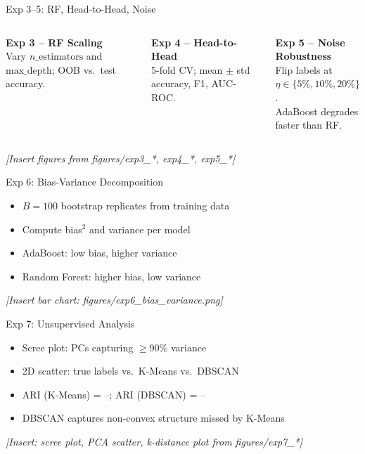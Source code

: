\documentclass[aspectratio=169,12pt]{beamer}
\begin{document}
\begin{frame}{Exp 3--5: RF, Head-to-Head, Noise}
\begin{columns}
\textbf{Exp 3 -- RF Scaling}\\
Vary $n\_\text{estimators}$ and $\text{max\_depth}$; OOB vs.\ test accuracy.

\medskip
\textbf{Exp 4 -- Head-to-Head}\\
5-fold CV; mean $\pm$ std accuracy, F1, AUC-ROC.

\textbf{Exp 5 -- Noise Robustness}\\
Flip labels at $\eta \in \{5\%, 10\%, 20\%\}$.\\
AdaBoost degrades faster than RF.
\end{columns}
\vfill
\textit{[Insert figures from figures/exp3\_*, exp4\_*, exp5\_*]}
\end{frame}

\begin{frame}{Exp 6: Bias-Variance Decomposition}
\begin{itemize}
  \item $B = 100$ bootstrap replicates from training data
  \item Compute bias$^2$ and variance per model
  \item AdaBoost: low bias, higher variance
  \item Random Forest: higher bias, low variance
\end{itemize}
\vfill
\textit{[Insert bar chart: figures/exp6\_bias\_variance.png]}
\end{frame}

\begin{frame}{Exp 7: Unsupervised Analysis}
\begin{itemize}
  \item Scree plot: PCs capturing $\geq 90\%$ variance
  \item 2D scatter: true labels vs.\ K-Means vs.\ DBSCAN
  \item ARI (K-Means) = --; ARI (DBSCAN) = --
  \item DBSCAN captures non-convex structure missed by K-Means
\end{itemize}
\vfill
\textit{[Insert: scree plot, PCA scatter, k-distance plot from figures/exp7\_*]}
\end{frame}
\end{document}
